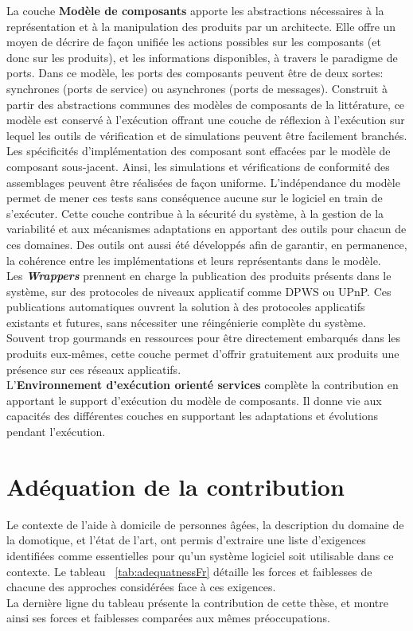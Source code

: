 La couche {\bf Modèle de composants} apporte les abstractions nécessaires à la représentation et à la manipulation des produits par un architecte. Elle offre un moyen de décrire de façon unifiée les actions possibles sur les composants (et donc sur les produits), et les informations disponibles, à travers le paradigme de ports. Dans ce modèle, les ports des composants peuvent être de deux sortes: synchrones (ports de service) ou asynchrones (ports de messages). Construit à partir des abstractions communes des modèles de composants de la littérature, ce modèle est conservé à l'exécution offrant une couche de réflexion à l'exécution sur lequel les outils de vérification et de simulations peuvent être facilement branchés.  Les spécificités d'implémentation des composant sont effacées par le modèle de composant sous-jacent. Ainsi, les simulations et vérifications de conformité des assemblages peuvent être réalisées de façon uniforme. L'indépendance du modèle permet de mener ces tests sans conséquence aucune sur le logiciel en train de s'exécuter. Cette couche contribue à la sécurité du système, à la gestion de la variabilité et aux mécanismes adaptations en apportant des outils pour chacun de ces domaines. Des outils ont aussi été développés afin de garantir, en permanence, la cohérence entre les implémentations et leurs représentants dans le modèle.\\



Les {\it\bf Wrappers} prennent en charge la publication des produits présents dans le système, sur des protocoles de niveaux applicatif comme DPWS ou UPnP. Ces publications automatiques ouvrent la solution à des protocoles applicatifs existants et futures, sans nécessiter une réingénierie complète du système. Souvent trop gourmands en ressources pour être directement embarqués dans les produits eux-mêmes, cette couche permet d'offrir gratuitement aux produits une présence sur ces réseaux applicatifs.\\

L'{\bf Environnement d'exécution orienté services} complète la contribution en apportant le support d'exécution du modèle de composants. Il donne vie aux capacités des différentes couches en supportant les adaptations et évolutions pendant l'exécution.\\


\section{Adéquation de la contribution}
\label{sec:adequationFr}
Le contexte de l'aide à domicile de personnes âgées, la description du domaine de la domotique, et l'état de l'art, ont permis d'extraire une liste d'exigences identifiées comme essentielles pour qu'un système logiciel soit utilisable dans ce contexte. Le tableau ~\ref{tab:adequatnessFr} détaille les forces et faiblesses de chacune des approches considérées face à ces exigences.\\
La dernière ligne du tableau présente la contribution de cette thèse, et montre ainsi ses forces et faiblesses comparées aux mêmes préoccupations.\\

